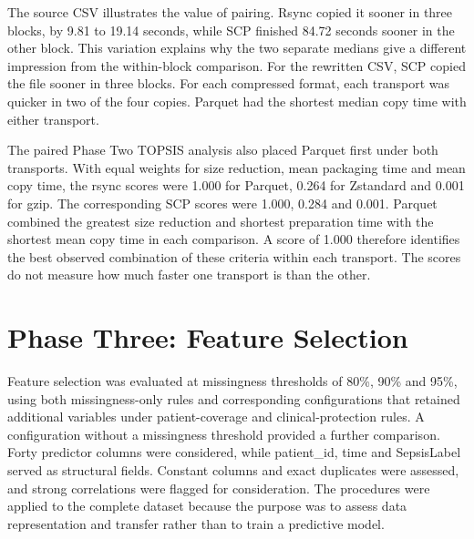 \noindent The source CSV illustrates the value of pairing. Rsync copied it sooner in three blocks, by 9.81 to 19.14 seconds, while SCP finished 84.72 seconds sooner in the other block. This variation explains why the two separate medians give a different impression from the within-block comparison. For the rewritten CSV, SCP copied the file sooner in three blocks. For each compressed format, each transport was quicker in two of the four copies. Parquet had the shortest median copy time with either transport.

\noindent The paired Phase Two TOPSIS analysis also placed Parquet first under both transports. With equal weights for size reduction, mean packaging time and mean copy time, the rsync scores were 1.000 for Parquet, 0.264 for Zstandard and 0.001 for gzip. The corresponding SCP scores were 1.000, 0.284 and 0.001. Parquet combined the greatest size reduction and shortest preparation time with the shortest mean copy time in each comparison. A score of 1.000 therefore identifies the best observed combination of these criteria within each transport. The scores do not measure how much faster one transport is than the other.

\section{Phase Three: Feature
	Selection}\label{phase-three-feature-selection}

Feature selection was evaluated at missingness thresholds of 80\%, 90\%
and 95\%, using both missingness-only rules and corresponding
configurations that retained additional variables under patient-coverage
and clinical-protection rules. A configuration without a missingness
threshold provided a further comparison. Forty predictor columns were
considered, while patient\_id, time and SepsisLabel served as structural
fields. Constant columns and exact duplicates were assessed, and strong
correlations were flagged for consideration. The procedures were applied
to the complete dataset because the purpose was to assess data
representation and transfer rather than to train a predictive model.

